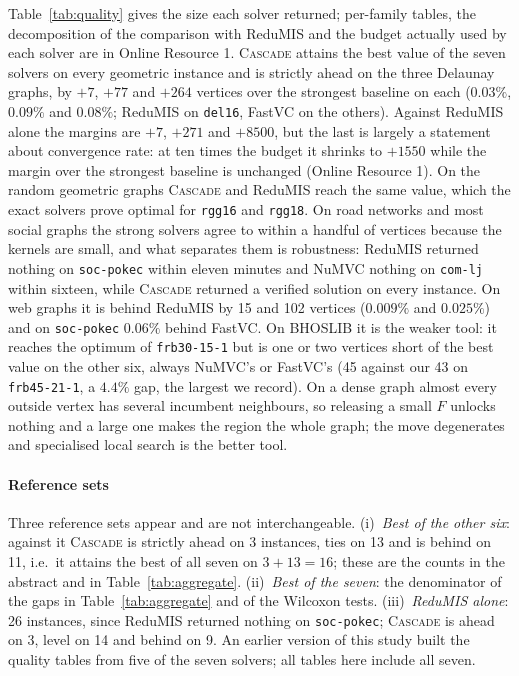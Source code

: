 \documentclass[pdflatex,sn-mathphys-num]{sn-jnl}
\theoremstyle{thmstyleone}%
\theoremstyle{thmstyletwo}%
\begin{document}
Table~\ref{tab:quality} gives the size each solver returned; per-family tables, the
decomposition of the comparison with ReduMIS and the budget actually used by each
solver are in Online Resource 1. \textsc{Cascade} attains the best value of the seven
solvers on every geometric instance and is strictly ahead on the three Delaunay
graphs, by $+7$, $+77$ and $+264$ vertices over the strongest baseline on each
($0.03\%$, $0.09\%$ and $0.08\%$; ReduMIS on \texttt{del16}, FastVC on the others). Against
ReduMIS alone the margins are $+7$, $+271$ and $+8500$, but the last is largely a
statement about convergence rate: at ten times the budget it shrinks to $+1550$ while
the margin over the strongest baseline is unchanged (Online Resource 1). On the random
geometric graphs \textsc{Cascade} and ReduMIS reach the same value, which the exact
solvers prove optimal for \texttt{rgg16} and \texttt{rgg18}. On road networks and most
social graphs the strong solvers agree to within a handful of vertices because the
kernels are small, and what separates them is robustness: ReduMIS returned nothing on
\texttt{soc-pokec} within eleven minutes and NuMVC nothing on \texttt{com-lj} within
sixteen, while \textsc{Cascade} returned a verified solution on every instance. On web
graphs it is behind ReduMIS by 15 and 102 vertices ($0.009\%$ and $0.025\%$) and on
\texttt{soc-pokec} $0.06\%$ behind FastVC. On BHOSLIB it is the weaker tool: it reaches
the optimum of \texttt{frb30-15-1} but is one or two vertices short of the best value
on the other six, always NuMVC's or FastVC's (45 against our 43 on
\texttt{frb45-21-1}, a $4.4\%$ gap, the largest we record). On a dense graph almost
every outside vertex has several incumbent neighbours, so releasing a small $F$
unlocks nothing and a large one makes the region the whole graph; the move degenerates
and specialised local search is the better tool.

\paragraph{Reference sets} Three reference sets appear and are not interchangeable.
(i)~\emph{Best of the other six}: against it \textsc{Cascade} is strictly ahead on 3
instances, ties on 13 and is behind on 11, i.e.\ it attains the best of all seven on
$3+13=16$; these are the counts in the abstract and in Table~\ref{tab:aggregate}.
(ii)~\emph{Best of the seven}: the denominator of the gaps in Table~\ref{tab:aggregate}
and of the Wilcoxon tests. (iii)~\emph{ReduMIS alone}: 26 instances, since ReduMIS
returned nothing on \texttt{soc-pokec}; \textsc{Cascade} is ahead on 3, level on 14
and behind on 9. An earlier version of this study built the quality tables from five of
the seven solvers; all tables here include all seven.
\end{document}
